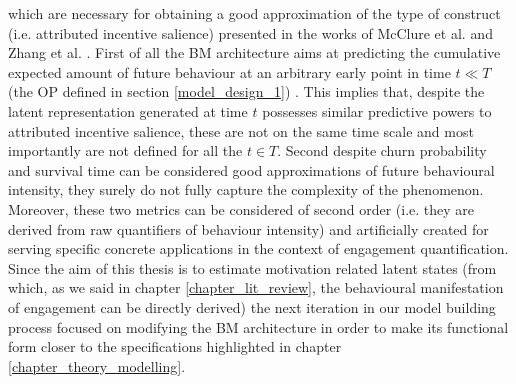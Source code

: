 which are necessary for obtaining a good approximation of the type of construct (i.e. attributed incentive salience) presented in the works of McClure et al. \cite{mcclure2003computational} and Zhang et al. \cite{zhang2009neural}. First of all the BM architecture aims at predicting the cumulative expected amount of future behaviour at an arbitrary early point in time $t \ll T$ (the OP defined in section \ref{model_design_1}) . This implies that, despite the latent representation generated at time $t$ possesses similar predictive powers to attributed incentive salience, these are not on the same time scale and most importantly are not defined for all the $t \in T$. Second despite churn probability and survival time can be considered good approximations of future behavioural intensity, they surely do not fully capture the complexity of the phenomenon. Moreover, these two metrics can be considered of second order (i.e. they are derived from raw quantifiers of behaviour intensity) and artificially created for serving specific concrete applications in the context of engagement quantification. Since the aim of this thesis is to estimate motivation related latent states (from which, as we said in chapter \ref{chapter_lit_review}, the behavioural manifestation of engagement can be directly derived) the next iteration in our model building process focused on modifying the BM architecture in order to make its functional form closer to the specifications highlighted in chapter \ref{chapter_theory_modelling}.

